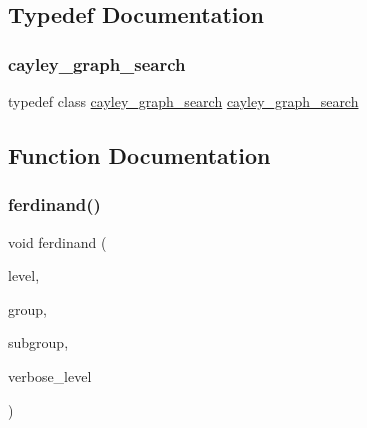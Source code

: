 \subsection{Typedef Documentation}
\mbox{\label{ferdinand_8_c_a7120aac32412ddcafb3d8444f0d038a5}} 
\subsubsection{\texorpdfstring{cayley\+\_\+graph\+\_\+search}{cayley\_graph\_search}}
{\footnotesize\ttfamily typedef class \mbox{\hyperlink{classcayley__graph__search}{cayley\+\_\+graph\+\_\+search}} \mbox{\hyperlink{classcayley__graph__search}{cayley\+\_\+graph\+\_\+search}}}



\subsection{Function Documentation}
\mbox{\label{ferdinand_8_c_a39bebb7bf2c2202d76f42c63c46512ed}} 
\subsubsection{\texorpdfstring{ferdinand()}{ferdinand()}}
{\footnotesize\ttfamily void ferdinand (\begin{DoxyParamCaption}\item[{\mbox{\hyperlink{galois_8h_a09fddde158a3a20bd2dcadb609de11dc}{I\+NT}}}]{level,  }\item[{\mbox{\hyperlink{galois_8h_a09fddde158a3a20bd2dcadb609de11dc}{I\+NT}}}]{group,  }\item[{\mbox{\hyperlink{galois_8h_a09fddde158a3a20bd2dcadb609de11dc}{I\+NT}}}]{subgroup,  }\item[{\mbox{\hyperlink{galois_8h_a09fddde158a3a20bd2dcadb609de11dc}{I\+NT}}}]{verbose\+\_\+level }\end{DoxyParamCaption})}

\mbox{\label{ferdinand_8_c_aa2b6e474e95c34c9f692acf51758dbb3}} 

